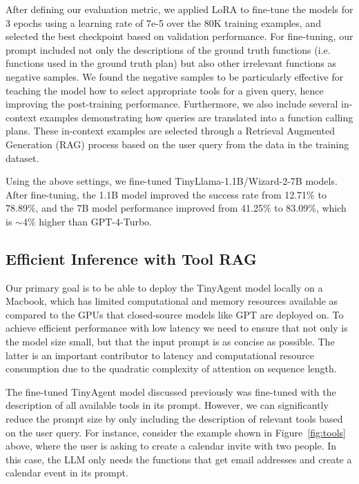After defining our evaluation metric, we applied LoRA \cite{hu2021lora} to fine-tune the models for 3 epochs using a learning rate of 7e-5 over the 80K training examples, and selected the best checkpoint based on validation performance. For fine-tuning, our prompt included not only the descriptions of the ground truth functions (i.e. functions used in the ground truth plan) but also other irrelevant functions as negative samples. We found the negative samples to be particularly effective for teaching the model how to select appropriate tools for a given query, hence improving the post-training performance. Furthermore, we also include several in-context examples demonstrating how queries are translated into a function calling plans. These in-context examples are selected through a Retrieval Augmented Generation (RAG) process based on the user query from the data in the training dataset.

Using the above settings, we fine-tuned TinyLlama-1.1B/Wizard-2-7B models. After fine-tuning, the 1.1B model improved the success rate from 12.71\% to 78.89\%, and the 7B model performance improved from 41.25\% to 83.09\%, which is $\sim$4\% higher than GPT-4-Turbo.




\subsection{Efficient Inference with Tool RAG}

Our primary goal is to be able to deploy the TinyAgent model locally on a Macbook, which has limited computational and memory resources available as compared to the GPUs that closed-source models like GPT are deployed on. To achieve efficient performance with low latency we need to ensure that not only is the model size small, but that the input prompt is as concise as possible. The latter is an important contributor to latency and computational resource consumption due to the quadratic complexity of attention on sequence length.

The fine-tuned TinyAgent model discussed previously was fine-tuned with the description of all available tools in its prompt. However, we can significantly reduce the prompt size by only including the description of relevant tools based on the user query. For instance, consider the example shown in Figure~\ref{fig:tools} above, where the user is asking to create a calendar invite with two people. In this case, the LLM only needs the functions that get email addresses and create a calendar event in its prompt.



